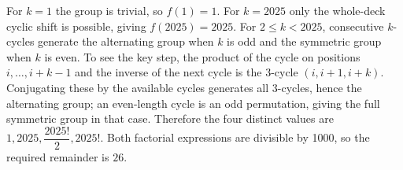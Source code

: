 For $k=1$ the group is trivial, so $f(1)=1$. For $k=2025$ only the whole-deck cyclic shift is possible, giving $f(2025)=2025$. For $2\le k<2025$, consecutive $k$-cycles generate the alternating group when $k$ is odd and the symmetric group when $k$ is even. To see the key step, the product of the cycle on positions $i,\ldots,i+k-1$ and the inverse of the next cycle is the 3-cycle $(i,i+1,i+k)$. Conjugating these by the available cycles generates all 3-cycles, hence the alternating group; an even-length cycle is an odd permutation, giving the full symmetric group in that case. Therefore the four distinct values are $1 , 2025 , \dfrac{2025 !}{2} , 2025 !$. Both factorial expressions are divisible by 1000, so the required remainder is $\boxed{26}$.
